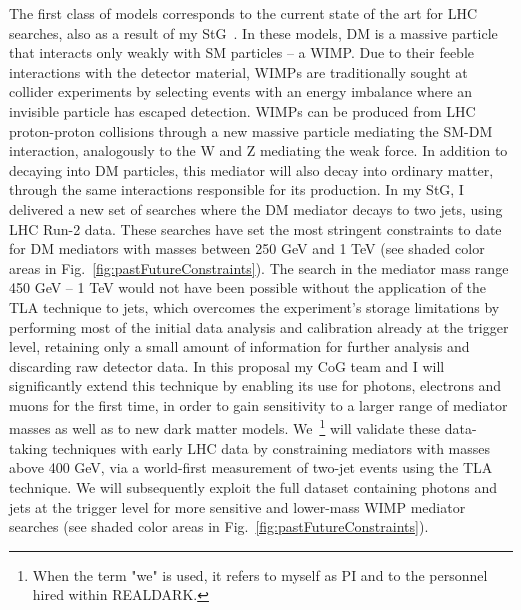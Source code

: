\documentclass[11pt,a4paper]{article}
\begin{document}
The first class of models corresponds to the current state of the art for LHC searches, also as a result of my StG~\cite{Abercrombie:2015wmb,Boveia:2018yeb}. 
In these models, DM is a massive particle that interacts only weakly with SM particles -- a WIMP. 
Due to their feeble interactions with the detector material, WIMPs are traditionally sought at collider experiments by selecting events with an energy imbalance where an invisible particle has escaped detection. 
WIMPs can be produced from LHC proton-proton collisions through a new massive particle mediating the SM-DM interaction, analogously to the W and Z mediating the weak force. In addition to decaying into DM particles, this mediator will also decay into ordinary matter, through the same interactions responsible for its production. 
In my StG, I delivered a new set of searches where the DM mediator decays to two jets, using LHC Run-2 data. 
These searches have set the most stringent constraints to date for DM mediators with masses between 250 GeV and 1 TeV (see shaded \color{red} color \color{black} areas in Fig.~\ref{fig:pastFutureConstraints}). 
The search in the mediator mass range 450 GeV -- 1 TeV would not have been possible without the application of the TLA technique to jets, which overcomes the experiment's storage limitations by performing most of the initial data analysis and calibration already at the trigger level, retaining only a small amount of information for further analysis and discarding raw detector data. 
In this proposal my CoG team and I will significantly extend this technique by enabling its use for photons, electrons and muons for the first time, in order to gain sensitivity to a larger range of mediator masses as well as to new dark matter models. 
We~\footnote{When the term "we" is used, it refers to myself as PI and to the personnel hired within \textsc{REALDARK}.} will validate these data-taking techniques with early LHC data by constraining mediators with masses above 400 GeV, via a world-first measurement of two-jet events using the TLA technique. 
We will subsequently exploit the full dataset containing photons and jets at the trigger level for more sensitive and lower-mass WIMP mediator searches (see shaded \color{red} color \color{black} areas in Fig.~\ref{fig:pastFutureConstraints}). 
\end{document}

